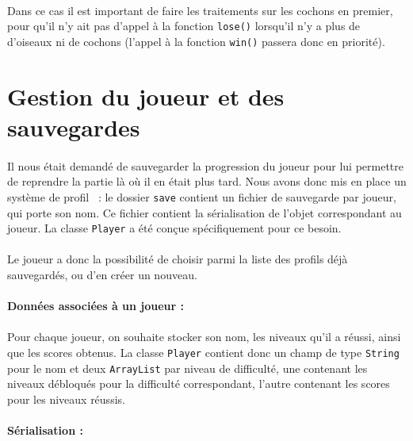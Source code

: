 \documentclass[a4paper,12pt]{report}
\begin{document}
\paragraph{}Dans ce cas il est important de faire les traitements sur les cochons en premier, pour qu'il n'y ait pas d'appel à la fonction \verb+lose()+ lorsqu'il n'y a plus de d'oiseaux ni de cochons (l'appel à la fonction \verb+win()+ passera donc en priorité).

\section{Gestion du joueur et des sauvegardes}
\paragraph{}Il nous était demandé de sauvegarder la progression du joueur pour lui permettre de reprendre la partie là où il en était plus tard. Nous avons donc mis en place un système de \guillemotleft profil\guillemotright~ : le dossier \verb+save+ contient un fichier de sauvegarde par joueur, qui porte son nom. Ce fichier contient la sérialisation de l'objet correspondant au joueur. La classe \verb+Player+ a été conçue spécifiquement pour ce besoin.

\paragraph{}Le joueur a donc la possibilité de choisir parmi la liste des profils déjà sauvegardés, ou d'en créer un nouveau.

\paragraph{Données associées à un joueur :}
\paragraph{}Pour chaque joueur, on souhaite stocker son nom, les niveaux qu'il a réussi, ainsi que les scores obtenus. La classe \verb+Player+ contient donc un champ de type \verb+String+ pour le nom et deux \verb+ArrayList+ par niveau de difficulté, une contenant les niveaux débloqués pour la difficulté correspondant, l'autre contenant les scores pour les niveaux réussis.

\paragraph{Sérialisation :}
\end{document}
